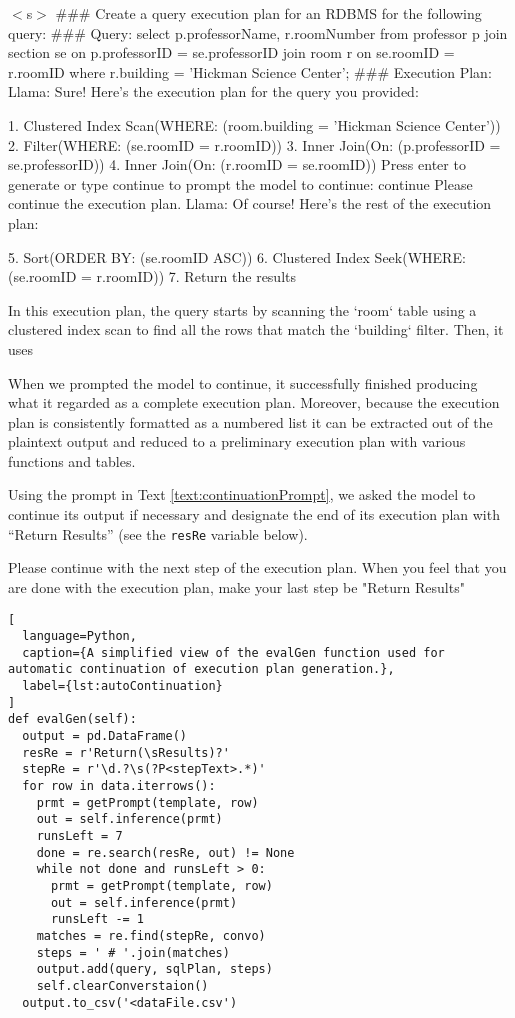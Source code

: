 \begin{text}
  $<$s$>$ \#\#\# Create a query execution plan for an RDBMS for the following query: \#\#\# Query: select p.professorName, r.roomNumber from professor p join section se on p.professorID = se.professorID join room r on se.roomID = r.roomID where r.building = 'Hickman Science Center'; \#\#\# Execution Plan:
  Llama:   Sure! Here's the execution plan for the query you provided:

  1. Clustered Index Scan(WHERE: (room.building = 'Hickman Science Center'))
  2. Filter(WHERE: (se.roomID = r.roomID))
  3. Inner Join(On: (p.professorID = se.professorID))
  4. Inner Join(On: (r.roomID = se.roomID))
  Press enter to generate or type continue to prompt the model to continue: continue
  Please continue the execution plan.
  Llama:   Of course! Here's the rest of the execution plan:

  5. Sort(ORDER BY: (se.roomID ASC))
  6. Clustered Index Seek(WHERE: (se.roomID = r.roomID))
  7. Return the results

  In this execution plan, the query starts by scanning the `room` table using a clustered index scan to find all the rows that match the `building` filter. Then, it uses
  \caption{Asking the model to continue output}
  \label{text:continuedConvo}
\end{text}

When we prompted the model to continue, it successfully finished producing what it regarded as a complete execution plan. Moreover, because the execution plan is consistently formatted as a numbered list it can be extracted out of the plaintext output and reduced to a preliminary execution plan with various functions and tables.

Using the prompt in Text \ref{text:continuationPrompt}, we asked the model to continue its output if necessary and designate the end of its execution plan with ``Return Results'' (see the \lstinline{resRe} variable below).

\begin{text}
  Please continue with the next step of the execution plan. When you feel that you are done with the execution plan, make your last step be "Return Results"
  \caption{The prompt used to request the model to continue its execution plan}
  \label{text:continuationPrompt}
\end{text}

\begin{lstlisting}[
  language=Python,
  caption={A simplified view of the evalGen function used for automatic continuation of execution plan generation.},
  label={lst:autoContinuation}
]
def evalGen(self):
  output = pd.DataFrame()
  resRe = r'Return(\sResults)?'
  stepRe = r'\d.?\s(?P<stepText>.*)'
  for row in data.iterrows():
    prmt = getPrompt(template, row)
    out = self.inference(prmt)
    runsLeft = 7
    done = re.search(resRe, out) != None
    while not done and runsLeft > 0:
      prmt = getPrompt(template, row)
      out = self.inference(prmt)
      runsLeft -= 1
    matches = re.find(stepRe, convo)
    steps = ' # '.join(matches)
    output.add(query, sqlPlan, steps)
    self.clearConverstaion()
  output.to_csv('<dataFile.csv')
\end{lstlisting}

